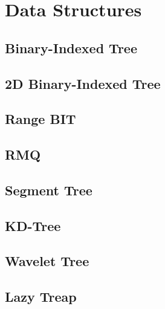 \section{Data Structures}
\subsection{Binary-Indexed Tree}
\raggedbottom
\hrulefill
\subsection{2D Binary-Indexed Tree}
\raggedbottom
\hrulefill
\subsection{Range BIT}
\raggedbottom
\hrulefill
\subsection{RMQ}
\raggedbottom
\hrulefill
\subsection{Segment Tree}
\raggedbottom
\hrulefill
\subsection{KD-Tree}
\raggedbottom
\hrulefill
\subsection{Wavelet Tree}
\raggedbottom
\hrulefill
\subsection{Lazy Treap}
\raggedbottom
\hrulefill


